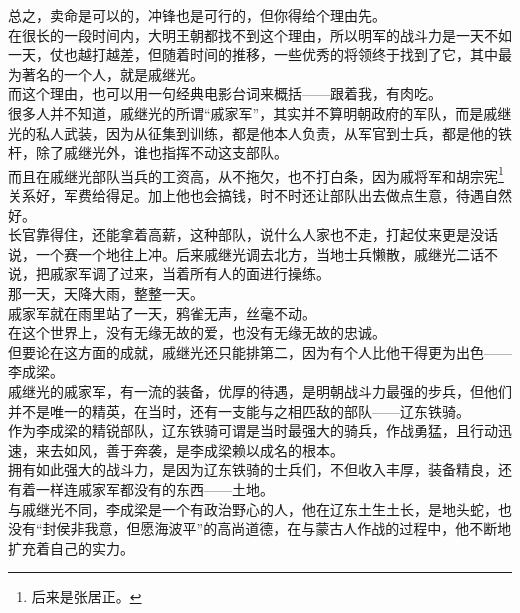 \begin{multicols}{\theparacolNo}
总之，卖命是可以的，冲锋也是可行的，但你得给个理由先。\\

在很长的一段时间内，大明王朝都找不到这个理由，所以明军的战斗力是一天不如一天，仗也越打越差，但随着时间的推移，一些优秀的将领终于找到了它，其中最为著名的一个人，就是戚继光。\\

而这个理由，也可以用一句经典电影台词来概括——跟着我，有肉吃。\\

很多人并不知道，戚继光的所谓“戚家军”，其实并不算明朝政府的军队，而是戚继光的私人武装，因为从征集到训练，都是他本人负责，从军官到士兵，都是他的铁杆，除了戚继光外，谁也指挥不动这支部队。\\

而且在戚继光部队当兵的工资高，从不拖欠，也不打白条，因为戚将军和胡宗宪\footnote{后来是张居正。}关系好，军费给得足。加上他也会搞钱，时不时还让部队出去做点生意，待遇自然好。\\

长官靠得住，还能拿着高薪，这种部队，说什么人家也不走，打起仗来更是没话说，一个赛一个地往上冲。后来戚继光调去北方，当地士兵懒散，戚继光二话不说，把戚家军调了过来，当着所有人的面进行操练。\\

那一天，天降大雨，整整一天。\\

戚家军就在雨里站了一天，鸦雀无声，丝毫不动。\\

在这个世界上，没有无缘无故的爱，也没有无缘无故的忠诚。\\

但要论在这方面的成就，戚继光还只能排第二，因为有个人比他干得更为出色——李成梁。\\

戚继光的戚家军，有一流的装备，优厚的待遇，是明朝战斗力最强的步兵，但他们并不是唯一的精英，在当时，还有一支能与之相匹敌的部队——辽东铁骑。\\

作为李成梁的精锐部队，辽东铁骑可谓是当时最强大的骑兵，作战勇猛，且行动迅速，来去如风，善于奔袭，是李成梁赖以成名的根本。\\

拥有如此强大的战斗力，是因为辽东铁骑的士兵们，不但收入丰厚，装备精良，还有着一样连戚家军都没有的东西——土地。\\

与戚继光不同，李成梁是一个有政治野心的人，他在辽东土生土长，是地头蛇，也没有“封侯非我意，但愿海波平”的高尚道德，在与蒙古人作战的过程中，他不断地扩充着自己的实力。\\


\end{multicols}
